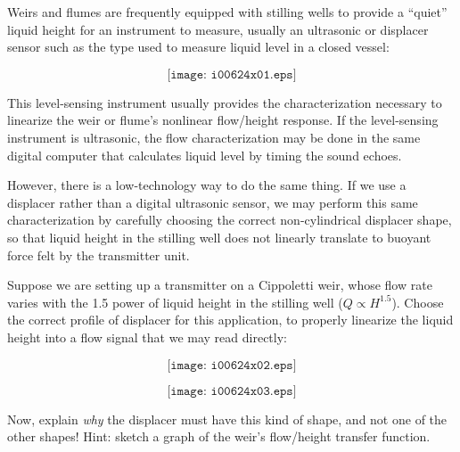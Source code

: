 

Weirs and flumes are frequently equipped with stilling wells to provide a ``quiet'' liquid height for an instrument to measure, usually an ultrasonic or displacer sensor such as the type used to measure liquid level in a closed vessel:

$$\texttt{[image: i00624x01.eps]}$$

This level-sensing instrument usually provides the characterization necessary to linearize the weir or flume's nonlinear flow/height response.  If the level-sensing instrument is ultrasonic, the flow characterization may be done in the same digital computer that calculates liquid level by timing the sound echoes.  

However, there is a low-technology way to do the same thing.  If we use a displacer rather than a digital ultrasonic sensor, we may perform this same characterization by carefully choosing the correct non-cylindrical displacer shape, so that liquid height in the stilling well does not linearly translate to buoyant force felt by the transmitter unit.

\vskip 10pt

Suppose we are setting up a transmitter on a Cippoletti weir, whose flow rate varies with the 1.5 power of liquid height in the stilling well ($Q \propto H^{1.5}$).  Choose the correct profile of displacer for this application, to properly linearize the liquid height into a flow signal that we may read directly:

$$\texttt{[image: i00624x02.eps]}$$







$$\texttt{[image: i00624x03.eps]}$$

Now, explain {\it why} the displacer must have this kind of shape, and not one of the other shapes!  Hint: sketch a graph of the weir's flow/height transfer function.











